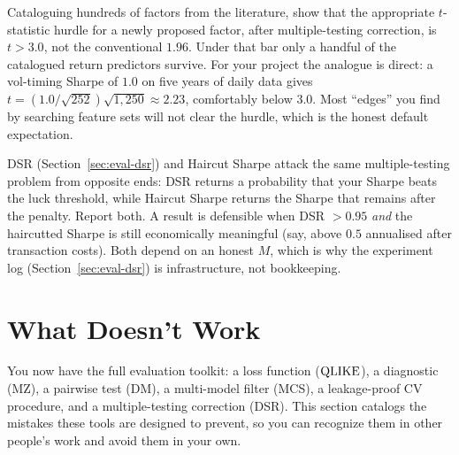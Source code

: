 \begin{keyresult}
Cataloguing hundreds of factors from the literature, \citet{HarveyLiuZhu2016} show that the appropriate $t$-statistic hurdle for a newly proposed factor, after multiple-testing correction, is $t > 3.0$, not the conventional $1.96$.
Under that bar only a handful of the catalogued return predictors survive.
For your project the analogue is direct: a vol-timing Sharpe of $1.0$ on five years of daily data gives $t = (1.0/\sqrt{252})\sqrt{1{,}250} \approx 2.23$, comfortably below $3.0$.
Most ``edges'' you find by searching feature sets will not clear the hurdle, which is the honest default expectation.
\end{keyresult}

\begin{keyidea}
DSR (Section~\ref{sec:eval-dsr}) and Haircut Sharpe attack the same multiple-testing problem from opposite ends: DSR returns a probability that your Sharpe beats the luck threshold, while Haircut Sharpe returns the Sharpe that remains after the penalty.
Report both.
A result is defensible when DSR $> 0.95$ \emph{and} the haircutted Sharpe is still economically meaningful (say, above $0.5$ annualised after transaction costs).
Both depend on an honest $M$, which is why the experiment log (Section~\ref{sec:eval-dsr}) is infrastructure, not bookkeeping.
\end{keyidea}


\section{What Doesn't Work}
\label{sec:eval-pitfalls}

You now have the full evaluation toolkit: a loss function ($\operatorname{QLIKE}$), a diagnostic (MZ), a pairwise test (DM), a multi-model filter (MCS), a leakage-proof CV procedure, and a multiple-testing correction (DSR).
This section catalogs the mistakes these tools are designed to prevent, so you can recognize them in other people's work and avoid them in your own.

